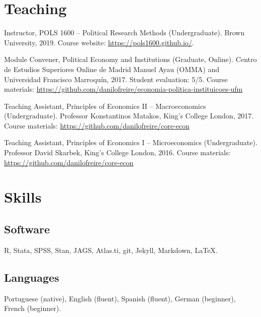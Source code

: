 \documentclass[a4paper]{article}
\renewenvironment{itemize}{
  \begin{list}{}{
    \setlength{\leftmargin}{1.5em}
  }
}{
  \end{list}
}
\begin{document}
\section*{Teaching}

\begin{itemize}
    \item Instructor, POLS 1600 -- Political Research Methods (Undergraduate). Brown University, 2019. Course website: \href{https://pols1600.github.io}{https://pols1600.github.io/}.
	\item Module Convener, Political Economy and Institutions (Graduate, Online). Centro de Estudios Superiores Online de Madrid Manuel Ayau (OMMA) and Universidad Francisco Marroquín, 2017. Student evaluation: 5/5. Course materials: \href{https://github.com/danilofreire/economia-politica-instituicoes-ufm}{https://github.com/danilofreire/economia-politica-instituicoes-ufm}
	\item Teaching Assistant, Principles of Economics II -- Macroeconomics (Undergraduate). Professor Konstantinos Matakos, King's College London, 2017. Course materials: \href{https://github.com/danilofreire/core-econ}{https://github.com/danilofreire/core-econ}
	\item Teaching Assistant, Principles of Economics I -- Microeconomics (Undergraduate). Professor David Skarbek, King's College London, 2016. Course materials: \href{https://github.com/danilofreire/core-econ}{https://github.com/danilofreire/core-econ}
\end{itemize}

\section*{Skills}

\subsection*{Software}

\begin{itemize}
	\item R, Stata, SPSS, Stan, JAGS, Atlas.ti, git, Jekyll, Markdown, \LaTeX{}.
\end{itemize}

\subsection*{Languages}

\begin{itemize}
	\item Portuguese (native), English (fluent), Spanish (fluent), German (beginner), French (beginner).
\end{itemize}
\end{document}
